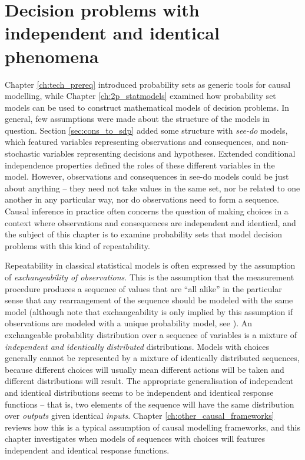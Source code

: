 
\chapter{Decision problems with independent and identical phenomena}\label{ch:evaluating_decisions}

Chapter \ref{ch:tech_prereq} introduced probability sets as generic tools for causal modelling, while Chapter \ref{ch:2p_statmodels} examined how probability set models can be used to construct mathematical models of decision problems. In general, few assumptions were made about the structure of the models in question. Section \ref{sec:cons_to_sdp} added some structure with \emph{see-do} models, which featured variables representing observations and consequences, and non-stochastic variables representing decisions and hypotheses. Extended conditional independence properties defined the roles of these different variables in the model. However, observations and consequences in see-do models could be just about anything -- they need not take values in the same set, nor be related to one another in any particular way, nor do observations need to form a sequence. Causal inference in practice often concerns the question of making choices in a context where observations and consequences are independent and identical, and the subject of this chapter is to examine probability sets that model decision problems with this kind of repeatability.

Repeatability in classical statistical models is often expressed by the assumption of \emph{exchangeability of observations}. This is the assumption that the measurement procedure produces a sequence of values that are ``all alike'' in the particular sense that any rearrangement of the sequence should be modeled with the same model (although note that exchangeability is only implied by this assumption if observations are modeled with a unique probability model, see \citet[pg. 463]{walley_statistical_1991}). An exchangeable probability distribution over a sequence of variables is a mixture of \emph{independent and identically distributed} distributions. Models with choices generally cannot be represented by a mixture of identically distributed sequences, because different choices will usually mean different actions will be taken and different distributions will result. The appropriate generalisation of independent and identical distributions seems to be independent and identical response functions -- that is, two elements of the sequence will have the same distribution over \emph{outputs} given identical \emph{inputs}. Chapter \ref{ch:other_causal_frameworks} reviews how this is a typical assumption of causal modelling frameworks, and this chapter investigates when models of sequences with choices will features independent and identical response functions.

